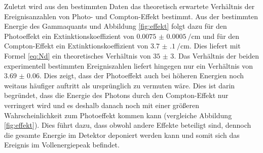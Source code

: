 Zuletzt wird aus den bestimmten Daten das theoretisch erwartete Verhältnis der Ereignisanzahlen von Photo- und Compton-Effekt bestimmt. Aus der bestimmten Energie des Gammaquants und Abbildung \ref{fig:effekt} folgt dazu für den Photoeffekt ein Extinktionskoeffizient von $\SI{0.0075(5)}{\per\centi\meter}$ und für den Compton-Effekt ein Extinktionskoeffizient von $\SI{3.7(1)}{\per\centi\meter}$. Dies liefert mit Formel \eqref{eq:Nd} ein theoretisches Verhältnis von $\num{35(3)}$. Das Verhältnis der beiden experimentell bestimmten Ereigniszahlen liefert hingegen nur ein Verhältnis von $\num{3.69(6)}$. Dies zeigt, dass der Photoeffekt auch bei höheren Energien noch weitaus häufiger auftritt als ursprünglich zu vermuten wäre. Dies ist darin begründet, dass die Energie des Photons durch den Compton-Effekt nur verringert wird und es deshalb danach noch mit einer größeren Wahrscheinlichkeit zum Photoeffekt kommen kann (vergleiche Abbildung \ref{fig:effekt}). Dies führt dazu, dass obwohl andere Effekte beteiligt sind, dennoch die gesamte Energie im Detektor deponiert werden kann und somit sich das Ereignis im Vollenergiepeak befindet.


